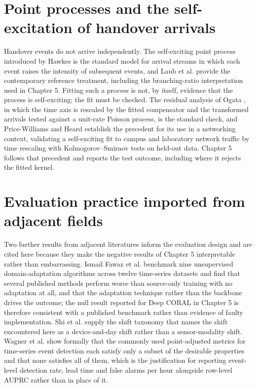 \section{Point processes and the self-excitation of handover arrivals}
\label{sec:2_7}

Handover events do not arrive independently. The self-exciting point process introduced by Hawkes \cite{ref23} is the standard model for arrival streams in which each event raises the intensity of subsequent events, and Laub et al. \cite{ref24} provide the contemporary reference treatment, including the branching-ratio interpretation used in Chapter 5. Fitting such a process is not, by itself, evidence that the process is self-exciting; the fit must be checked. The residual analysis of Ogata \cite{ref25}, in which the time axis is rescaled by the fitted compensator and the transformed arrivals tested against a unit-rate Poisson process, is the standard check, and Price-Williams and Heard \cite{ref26} establish the precedent for its use in a networking context, validating a self-exciting fit to campus and laboratory network traffic by time rescaling with Kolmogorov--Smirnov tests on held-out data. Chapter 5 follows that precedent and reports the test outcome, including where it rejects the fitted kernel.


\section{Evaluation practice imported from adjacent fields}
\label{sec:2_8}

Two further results from adjacent literatures inform the evaluation design and are cited here because they make the negative results of Chapter 5 interpretable rather than embarrassing. Ismail Fawaz et al. \cite{ref27} benchmark nine unsupervised domain-adaptation algorithms across twelve time-series datasets and find that several published methods perform worse than source-only training with no adaptation at all, and that the adaptation technique rather than the backbone drives the outcome; the null result reported for Deep CORAL \cite{ref28} in Chapter 5 is therefore consistent with a published benchmark rather than evidence of faulty implementation. Shi et al. \cite{ref29} supply the shift taxonomy that names the shift encountered here as a device-and-day shift rather than a sensor-modality shift. Wagner et al. \cite{ref30} show formally that the commonly used point-adjusted metrics for time-series event detection each satisfy only a subset of the desirable properties and that none satisfies all of them, which is the justification for reporting event-level detection rate, lead time and false alarms per hour alongside row-level AUPRC rather than in place of it.

